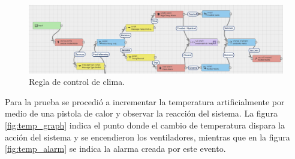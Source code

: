 \begin{figure}[h]
	\centering
	\includegraphics[width=1\textwidth]{./Figures/chapter4/temp_rule.jpg}
	\caption[Regla de control de clima]{Regla de control de clima.}
	\label{fig:temp_rule}
\end{figure}

Para la prueba se procedió a incrementar la temperatura artificialmente por medio de una pistola de calor y observar la reacción del sistema. La figura \ref{fig:temp_graph} indica el punto donde el cambio de temperatura dispara la acción del sistema y se encendieron los ventiladores, mientras que en la figura \ref{fig:temp_alarm} se indica la alarma creada por este evento.  









